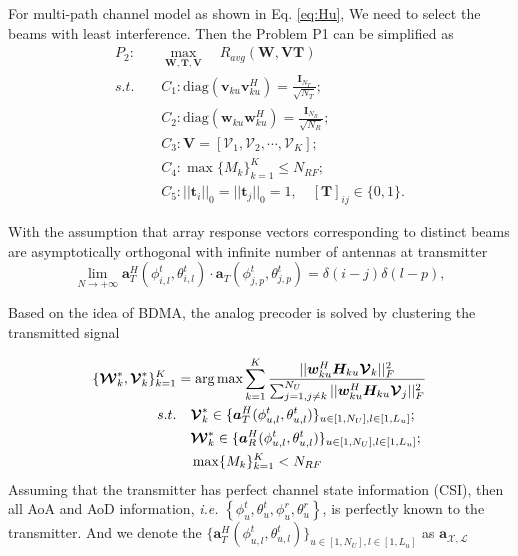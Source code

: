 \documentclass[conference]{IEEEtran}
\def\argmax{\mathop{\mbox{arg\,max}}}
\begin{document}
For multi-path channel model as shown in Eq. \eqref{eq:Hu}, We need to select the beams with least interference. Then the Problem P1 can be simplified as 
\begin{align}\label{eq:analog}
P_2: \quad&\max_{\bm W, \bm T, \bm{V}}\quad R_{avg}(\bm{W},\bm{VT})\\ \nonumber
s.t. \quad&C_1: \text{diag}(\bm{v}_{ku}\bm{v}_{ku}^H)=\frac{\bm{I}_{N_T}}{\sqrt{N_T}};\\
&C_2: \text{diag}(\bm{w}_{ku}\bm{w}_{ku}^H)=\frac{\bm{I}_{N_{R}}}{\sqrt{N_R}};\nonumber\\
&C_3: \bm{V} = [\bm{\mathcal{V}}_1, \bm{\mathcal{V}}_2, \cdots, \bm{\mathcal{V}}_K];\nonumber\\
&C_4: \max \{M_k\}_{k=1}^K \leq N_{RF};\nonumber\\
&C_5: ||\bm{t}_{i}||_0=||\bm{t}_{j}||_0=1, \quad [\bm{T}]_{ij}\in\{0,1\}.\nonumber
\end{align}

With the assumption that array response vectors corresponding to distinct beams are asymptotically orthogonal with infinite number of antennas at transmitter
\begin{equation}\label{Eq:assumption}
\lim_{N\rightarrow +\infty} \bm{a}^H_{T}(\phi^t_{i,l},\theta^t_{i,l}) \cdot\bm{a}_{T}(\phi^t_{j,p},\theta^t_{j,p})=\delta(i-j)\delta(l-p),
\end{equation}

Based on the idea of BDMA, the analog precoder is solved by clustering the transmitted signal

\begin{align}\label{eq:group-scheduling}
\{\bm{\mathcal{W}}^*_k, \bm{\mathcal{V}}^*_k\}_{k=1}^{K} &= \argmax \sum_{k=1}^{K}\frac{||\bm{w}^H_{ku} \bm{H}_{ku} \bm{\mathcal{V}}_k||_F^2}{\sum_{j=1,j\neq k}^{N_U}||\bm{w}^H_{ku} \bm{H}_{ku} \bm{\mathcal{V}}_j||_F^2}  \\ \nonumber
s.t. &\quad \bm{\mathcal{V}}^*_{k} \in  \{\bm{a}^H_{T}(\phi^t_{u,l},\theta^t_{u,l})\}_{u\in [1,N_U], l\in [1,L_u]}; \\
&\quad \bm{\mathcal{W}}^*_k \in \{\bm{a}^H_{R}(\phi^t_{u,l},\theta^t_{u,l})\}_{u\in [1,N_U], l\in [1,L_u]};\nonumber\\
&\quad \max\{M_k\}_{k=1}^K<N_{RF}
\end{align}
Assuming that the transmitter has perfect channel state information (CSI), then all AoA and AoD information, {\em i.e.} $\left\{\phi^t_u,\theta^t_u,\phi^r_u,\theta^r_u\right\}$, is perfectly known to the transmitter. And we denote the $\{\bm{a}^H_{T}(\phi^t_{u,l},\theta^t_{u,l})\}_{u\in [1,N_U], l\in [1,L_u]}$ as $\bm{a}_{\mathcal{X},\mathcal{L}}$
\end{document}
